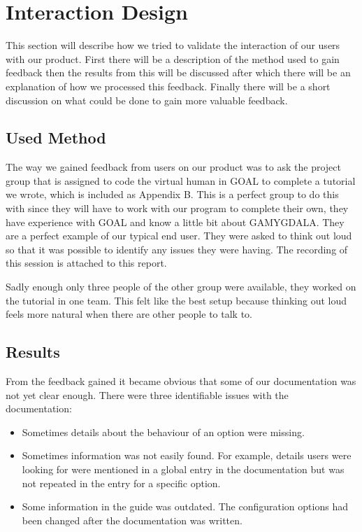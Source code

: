 \documentclass[11pt]{article}
\begin{document}
\section{Interaction Design}
This section will describe how we tried to validate the interaction of our users with our product. First there will be a description of the method used to gain feedback then the results from this will be discussed after which there will be an explanation of how we processed this feedback. Finally there will be a short discussion on what could be done to gain more valuable feedback.

\subsection{Used Method}
The way we gained feedback from users on our product was to ask the project group that is assigned to code the virtual human in GOAL to complete a tutorial we wrote, which is included as Appendix B. This is a perfect group to do this with since they will have to work with our program to complete their own, they have experience with GOAL and know a little bit about GAMYGDALA. They are a perfect example of our typical end user. They were asked to think out loud so that it was possible to identify any issues they were having. The recording of this session is attached to this report.

Sadly enough only three people of the other group were available, they worked on the tutorial in one team. This felt like the best setup because thinking out loud feels more natural when there are other people to talk to.

\subsection{Results}
From the feedback gained it became obvious that some of our documentation was not yet clear enough. There were three identifiable issues with the documentation:

\begin{itemize}
	\item Sometimes details about the behaviour of an option were missing.
	\item Sometimes information was not easily found. For example, details users were looking for were mentioned in a global entry in the documentation but was not repeated in the entry for a specific option.
	\item Some information in the guide was outdated. The configuration options had been changed after the documentation was written.
\end{itemize}
\end{document}
